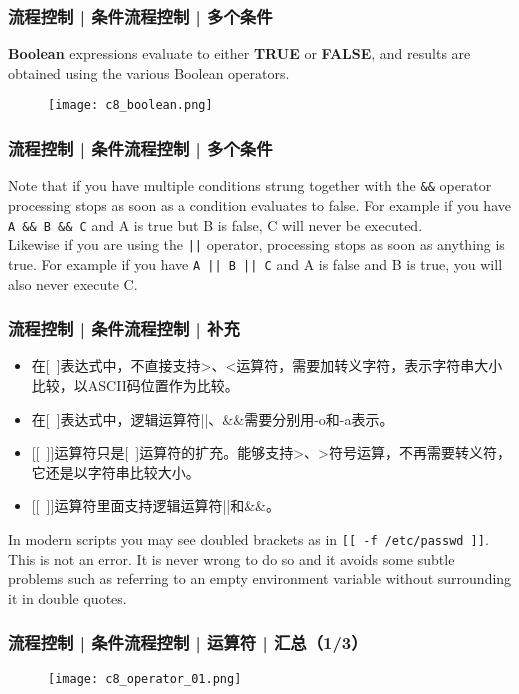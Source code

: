 \begin{frame}[fragile]
  \frametitle{流程控制 | 条件流程控制 | 多个条件}
  \textbf{Boolean} expressions evaluate to either \textbf{TRUE} or \textbf{FALSE}, and results are obtained using the various Boolean operators.
  \begin{figure}
    \centering
    \texttt{[image: c8\_boolean.png]}
  \end{figure}
\end{frame}

\begin{frame}[fragile]
  \frametitle{流程控制 | 条件流程控制 | 多个条件}
  Note that if you have multiple conditions strung together with the \verb|&&| operator processing stops as soon as a condition evaluates to false.  For example if you have \verb|A && B && C| and A is true but B is false, C will never be executed.\\
  \vspace{0.3cm}
  Likewise if you are using the \verb=||= operator, processing stops as soon as anything is true. For example if you have \verb=A || B || C= and A is false and B is true, you will also never execute C.
\end{frame}

\begin{frame}[fragile]
  \frametitle{流程控制 | 条件流程控制 | 补充}
  \begin{itemize}
    \item 在[\ ]表达式中，不直接支持>、<运算符，需要加转义字符，表示字符串大小比较，以ASCII码位置作为比较。
    \item 在[\ ]表达式中，逻辑运算符||、\&\&需要分别用-o和-a表示。
    \item {[[}\ {]]}运算符只是[\ ]运算符的扩充。能够支持>、>符号运算，不再需要转义符，它还是以字符串比较大小。
    \item {[[}\ {]]}运算符里面支持逻辑运算符||和\&\&。
  \end{itemize}
  In modern scripts you may see doubled brackets as in \verb|[[ -f /etc/passwd ]]|. This is not an error. It is never wrong to do so and it avoids some subtle problems such as referring to an empty environment variable without surrounding it in double quotes.
\end{frame}

\begin{frame}
  \frametitle{流程控制 | 条件流程控制 | 运算符 | 汇总（1/3）}
  \begin{figure}
    \centering
    \texttt{[image: c8\_operator\_01.png]}
  \end{figure}
\end{frame}

